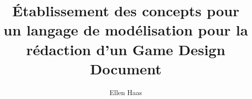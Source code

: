 \documentclass[12pt]{memoireuqam1.3}
\begin{document}
\title{Établissement des concepts pour un langage de modélisation pour la rédaction d'un Game Design Document}
\author{Ellen Haas}
\uqammemoire %
{}
\thispagestyle{empty}        %
\maketitle



\renewcommand \bibname{R\'EF\'ERENCES}%

\renewcommand \listfigurename{LISTE DES FIGURES}
\renewcommand \appendixname{APPENDICE}
\renewcommand \figurename{Figure}
\renewcommand \tablename{Tableau}

\addtocounter{page}{1} %

%


\tableofcontents %
\listoffigures %
\listoftables %





















\end{document}
